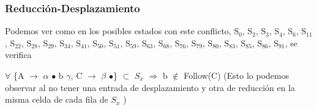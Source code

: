 \documentclass[a4paper, 12pt]{article}
\begin{document}
	\subsubsection*{Reducción-Desplazamiento}
	Podemos ver como en los posibles estados con este conflicto, S$_0$, S$_2$, S$_3$, S$_4$, S$_6$, S$_{11}$, S$_{22}$, S$_{28}$, S$_{29}$, S$_{34}$, S$_{41}$, S$_{50}$, S$_{51}$, S$_{59}$, S$_{63}$, S$_{68}$, S$_{76}$, S$_{79}$, S$_{80}$, S$_{83}$, S$_{85}$, S$_{86}$, S$_{91}$, se verifica
	
	$\forall$ \{A $\rightarrow$ $\alpha$ $\bullet$ b $\gamma$, C $\rightarrow$ $\beta$ $\bullet$\} $\subset$ $S_x$ $\Rightarrow$ b $\notin$ Follow(C) (Esto lo podemos observar al no tener una entrada de desplazamiento y otra de reducción en la misma celda de cada fila de $S_x$ )


\end{document}

